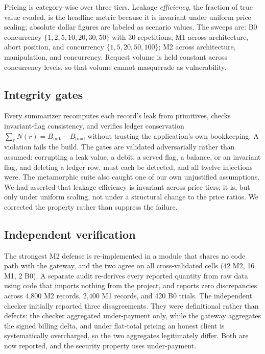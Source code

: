 \documentclass[preprint,3p,authoryear,12pt]{elsarticle}
\begin{document}
Pricing is category-wise over three tiers. Leakage \emph{efficiency}, the fraction of
true value evaded, is the headline metric because it is invariant under uniform price
scaling; absolute dollar figures are labeled as scenario values. The sweeps are: B0
concurrency $\{1,2,5,10,20,30,50\}$ with 30 repetitions; M1 across architecture, abort
position, and concurrency $\{1,5,20,50,100\}$; M2 across architecture, manipulation, and
concurrency. Request volume is held constant across concurrency levels, so that volume
cannot masquerade as vulnerability.

\subsection{Integrity gates}
Every summarizer recomputes each record's leak from primitives, checks invariant-flag
consistency, and verifies ledger conservation $\sum_r N(r) = B_{\mathrm{init}} -
B_{\mathrm{final}}$ without trusting the application's own bookkeeping. A violation fails
the build. The gates are validated adversarially rather than assumed: corrupting a leak
value, a debit, a served flag, a balance, or an invariant flag, and deleting a ledger row,
must each be detected, and all twelve injections were. The metamorphic suite also caught
one of our own unjustified assumptions. We had asserted that leakage efficiency is
invariant across price tiers; it is, but only under uniform scaling, not under a
structural change to the price ratios. We corrected the property rather than suppress the
failure.

\subsection{Independent verification}
The strongest M2 defense is re-implemented in a module that shares no code path with the
gateway, and the two agree on all cross-validated cells (42 M2, 16 M1, 2 B0). A separate
audit re-derives every reported quantity from raw data using code that imports nothing
from the project, and reports zero discrepancies across 4{,}800 M2 records, 2{,}400 M1
records, and 420 B0 trials. The independent checker initially reported three
disagreements. They were definitional rather than defects: the checker aggregated
under-payment only, while the gateway aggregates the signed billing delta, and under
flat-total pricing an honest client is systematically overcharged, so the two aggregates
legitimately differ. Both are now reported, and the security property uses under-payment.
\end{document}
